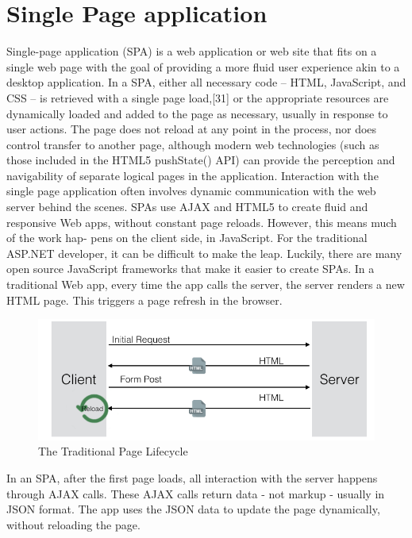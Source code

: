 \section{Single Page application}
\label{sec:signle_page_application}
Single-page application (SPA) is a web application or web site that fits on a single web page with the goal of providing a more fluid user experience akin to a desktop application. In a SPA, either all necessary code – HTML, JavaScript, and CSS – is retrieved with a single page load,[31] or the appropriate resources are dynamically loaded and added to the page as necessary, usually in response to user actions. The page does not reload at any point in the process, nor does control transfer to another page, although modern web technologies (such as those included in the HTML5 pushState() API) can provide the perception and navigability of separate logical pages in the application. Interaction with the single page application often involves dynamic communication with the web server behind the scenes.
\newline
SPAs use AJAX and HTML5 to create fluid and responsive Web apps, without constant page reloads. However, this means much of the work hap- pens on the client side, in JavaScript. For the traditional ASP.NET developer, it can be difficult to make the leap. Luckily, there are many open source JavaScript frameworks that make it easier to create SPAs.
In a traditional Web app, every time the app calls the server, the server renders a new HTML page. This triggers a page refresh in the browser.
\begin{figure}[htb]
 \centering
 \includegraphics[width=1.0\linewidth]{images/chapter3/trad_life.png}\hfill
 \caption[Traditional Page Lifecycle]{The Traditional Page Lifecycle}
 \label{fig:traditional_page_lifecycle}
\end{figure}
In an SPA, after the first page loads, all interaction with the server happens through AJAX calls. These AJAX calls return data - not markup - usually in JSON format. The app uses the JSON data to update the page dynamically, without reloading the page.
